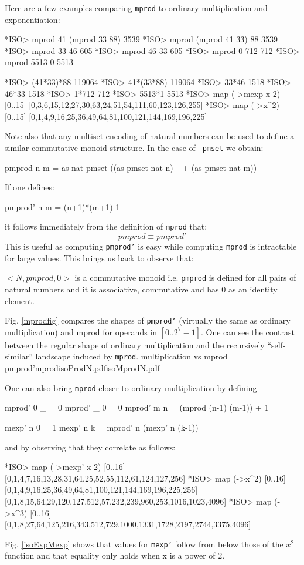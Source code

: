 \documentclass[]{INCLUDES/llncs}
\begin{document}
Here are a few examples comparing {\tt mprod} to ordinary multiplication and
exponentiation:
\begin{codex}
*ISO> mprod 41 (mprod 33 88)
3539
*ISO> mprod (mprod 41 33)  88
3539
*ISO> mprod 33 46
605
*ISO> mprod 46 33
605
*ISO> mprod 0 712
712
*ISO> mprod 5513 0
5513

*ISO> (41*33)*88
119064
*ISO> 41*(33*88)
119064
*ISO> 33*46
1518
*ISO> 46*33
1518
*ISO> 1*712
712
*ISO> 5513*1
5513
*ISO> map (\x->mexp x 2) [0..15]
[0,3,6,15,12,27,30,63,24,51,54,111,60,123,126,255]
*ISO> map (\x->x^2) [0..15]
[0,1,4,9,16,25,36,49,64,81,100,121,144,169,196,225]
\end{codex}
Note also that any multiset encoding of natural numbers can be
used to define a similar commutative monoid structure. In the case of {\tt
pmset} we obtain:
\begin{code}
pmprod n m = as nat pmset ((as pmset nat n) ++ (as pmset nat m))
\end{code}
If one defines:
\begin{code}
pmprod' n m = (n+1)*(m+1)-1
\end{code}
it follows immediately from the definition of {\tt mprod} that:
\begin{equation}
pmprod \equiv pmprod'
\end{equation}
This is useful as computing {\tt pmprod'} is easy while computing {\tt mprod} is
intractable for large values. This brings us back to observe that:
\begin{prop}
$<N,pmprod,0>$ is a commutative monoid i.e. {\tt pmprod} is defined for all pairs of
natural numbers and it is associative, commutative
and has 0 as an identity element.
\end{prop}

Fig. \ref{mprodfig} compares the shapes of {\tt pmprod'} (virtually the same as
ordinary multiplication) and mprod for operands in $[0..2^7-1]$. 
One can see the contrast between the regular shape of ordinary multiplication
and the recursively ``self-similar'' landscape induced by {\tt mprod}.
{multiplication vs mprod}
{pmprod'}{mprod}{isoProdN.pdf}{isoMprodN.pdf}

One can also bring {\tt mprod} closer to ordinary multiplication by defining
\begin{code}
mprod' 0 _ = 0
mprod' _ 0 = 0
mprod' m n = (mprod (n-1) (m-1)) + 1

mexp' n 0 = 1
mexp' n k = mprod' n (mexp' n (k-1))
\end{code}
and by observing that they correlate as follows:
\begin{codex}
*ISO> map (\x->mexp' x 2) [0..16]
[0,1,4,7,16,13,28,31,64,25,52,55,112,61,124,127,256]
*ISO> map (\x->x^2) [0..16]
[0,1,4,9,16,25,36,49,64,81,100,121,144,169,196,225,256]
[0,1,8,15,64,29,120,127,512,57,232,239,960,253,1016,1023,4096]
*ISO> map (\x->x^3) [0..16]
[0,1,8,27,64,125,216,343,512,729,1000,1331,1728,2197,2744,3375,4096]
\end{codex}
Fig. \ref{isoExpMexp} shows that values for {\tt mexp'} follow from below those
of the $x^2$ function and that equality only holds when x is a power of 2.
\end{document}
